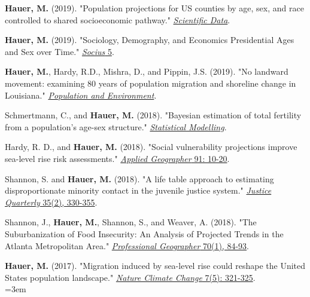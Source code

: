
 \begin{etaremune}
 
  \item \textbf{Hauer, M.} (2019). "Population projections for US counties by age, sex, and race controlled to shared socioeconomic pathway." \href{https://www.nature.com/articles/sdata20195}{\textit{Scientific Data}}.
 
   \item \textbf{Hauer, M.} (2019). "Sociology, Demography, and Economics Presidential Ages and Sex over Time." \href{https://journals.sagepub.com/doi/abs/10.1177/2378023118825221}{\textit{Socius} 5}.
 
  \item \textbf{Hauer, M.}, Hardy, R.D., Mishra, D., and Pippin, J.S. (2019). "No landward movement: examining 80 years of population migration and shoreline change in Louisiana." \href{https://link.springer.com/article/10.1007/s11111-019-00315-8}{\textit{Population and Environment}}.
 
 \item Schmertmann, C., and \textbf{Hauer, M.} (2018). "Bayesian estimation of total fertility from a population's age-sex structure." \href{https://doi.org/10.1177/1471082X18801450 }{\textit{Statistical Modelling}}.
 
\item Hardy, R. D., and \textbf{Hauer, M.} (2018). "Social vulnerability projections improve sea-level rise risk assessments." \href{https://www.sciencedirect.com/science/article/pii/S0143622817309189}{\textit{Applied Geographer} 91: 10-20}.
 
\item Shannon, S. and \textbf{Hauer, M.} (2018). "A life table approach to estimating disproportionate minority contact in the juvenile justice system." \href{http://www.tandfonline.com/doi/full/10.1080/07418825.2017.1315163}{\textit{Justice Quarterly} 35(2), 330-355}.

\item Shannon, J., \textbf{Hauer, M.}, Shannon, S., and Weaver, A. (2018). "The Suburbanization of Food Insecurity: An Analysis of Projected     Trends in the Atlanta Metropolitan Area." \href{http://www.tandfonline.com/doi/full/10.1080/00330124.2017.1325751}{\textit{Professional Geographer} 70(1), 84-93}.

\item \textbf{Hauer, M.} (2017). "Migration induced by sea-level rise could reshape the United States population landscape." \href{http://dx.doi.org/10.1038/nclimate3271}{\textit{Nature Climate Change} 7(5): 321-325}.\\
        \hangindent=3em \\
       

\end{etaremune}
